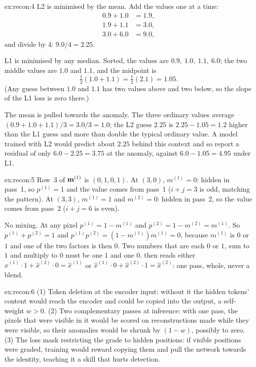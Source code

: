 \begin{solution}{ex:recon:4}
L2 is minimised by the mean. Add the values one at a time:
\begin{align*}
0.9 + 1.0 &= 1.9,\\
1.9 + 1.1 &= 3.0,\\
3.0 + 6.0 &= 9.0,
\end{align*}
and divide by 4: $9.0/4 = 2.25$.

L1 is minimised by any median. Sorted, the values are $0.9,\ 1.0,\ 1.1,\ 6.0$; the two middle values
are $1.0$ and $1.1$, and the midpoint is
\[
\tfrac12(1.0+1.1) = \tfrac12(2.1) = 1.05.
\]
(Any guess between $1.0$ and $1.1$ has two values above and two below, so the slope of the L1 loss is
zero there.)

The mean is pulled towards the anomaly. The three ordinary values average
$(0.9+1.0+1.1)/3 = 3.0/3 = 1.0$; the L2 guess $2.25$ is $2.25-1.05 = 1.2$ higher than the L1 guess
and more than double the typical ordinary value. A model trained with L2 would predict about $2.25$
behind this context and so report a residual of only $6.0-2.25 = 3.75$ at the anomaly, against
$6.0-1.05 = 4.95$ under L1.
\end{solution}

\begin{solution}{ex:recon:5}
Row~3 of $\mathbf{m}^{(1)}$ is $(0,1,0,1)$. At $(3,0)$, $m^{(1)}=0$: hidden in pass~1, so
$p^{(1)} = 1$ and the value comes from pass~1 ($i+j=3$ is odd, matching the pattern). At $(3,3)$,
$m^{(1)}=1$ and $m^{(2)}=0$: hidden in pass~2, so the value comes from pass~2 ($i+j=6$ is even).

No mixing. At any pixel $p^{(1)} = 1-m^{(1)}$ and $p^{(2)} = 1-m^{(2)} = m^{(1)}$. So
$p^{(1)}+p^{(2)} = 1$ and $p^{(1)}p^{(2)} = (1-m^{(1)})m^{(1)} = 0$, because $m^{(1)}$ is $0$ or $1$
and one of the two factors is then $0$. Two numbers that are each $0$ or $1$, sum to $1$ and multiply
to $0$ must be one $1$ and one $0$.  then reads either
$\hat{x}^{(1)}\cdot1 + \hat{x}^{(2)}\cdot0 = \hat{x}^{(1)}$ or $\hat{x}^{(1)}\cdot0 +
\hat{x}^{(2)}\cdot1 = \hat{x}^{(2)}$: one pass, whole, never a blend.
\end{solution}

\begin{solution}{ex:recon:6}
(1) Token deletion at the encoder input: without it the hidden tokens' content would reach the
encoder and could be copied into the output, a self-weight $w>0$. (2) Two complementary passes at
inference: with one pass, the pixels that were visible in it would be scored on reconstructions made
while they were visible, so their anomalies would be shrunk by $(1-w)$, possibly to zero. (3) The loss
mask restricting the grade to hidden positions: if visible positions were graded, training would reward
copying them and pull the network towards the identity, teaching it a skill that hurts detection.
\end{solution}
